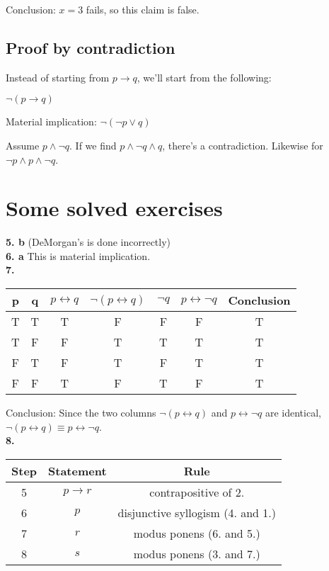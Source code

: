 \documentclass[english,openany]{book}
\begin{document}
	Conclusion: $x=3$ fails, so this claim is false.\newline


	\subsection{Proof by contradiction}

	Instead of starting from $p \rightarrow q$, we'll start from the following:

	$\neg (p \rightarrow q)$

	Material implication: $\neg(\neg p \lor q)$

	Assume $p \wedge \neg q$. If we find $p \wedge \neg q \wedge q$, there's a contradiction. Likewise for $\neg p \wedge p \wedge \neg q$.

	\section{Some solved exercises}

		\textbf{5. b} (DeMorgan's is done incorrectly)\\

	\textbf{6. a} This is material implication.\\

	\textbf{7. }

	\begin{tabular}{cc|cccc|c}
		p&q&$p \leftrightarrow q$&$\neg(p \leftrightarrow q)$&$\neg q$&$p \leftrightarrow \neg q$&Conclusion\\
		\hline
		T&T&T&F&F&F&T\\
		T&F&F&T&T&T&T\\
		F&T&F&T&F&T&T\\
		F&F&T&F&T&F&T\\
	\end{tabular}

	Conclusion: Since the two columns $\neg(p \leftrightarrow q)$ and $p \leftrightarrow \neg q$ are identical, $\neg(p \leftrightarrow q) \equiv p \leftrightarrow \neg q$.\\

	\textbf{8.}

	\begin{tabular}{c|c|c}
		Step&Statement&Rule\\
		\hline
		5&$p \rightarrow r$&contrapositive of 2.\\
		6&$p$&disjunctive syllogism (4. and 1.)\\
		7&$r$&modus ponens (6. and 5.)\\
		8&$s$&modus ponens (3. and 7.)\\
	\end{tabular}
\end{document}
